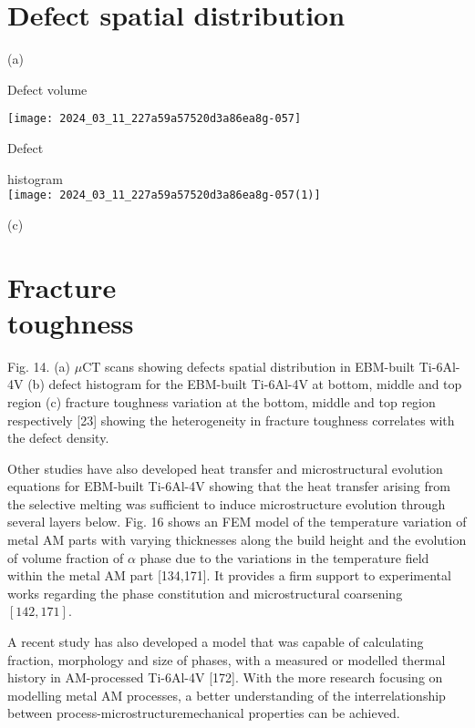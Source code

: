 \documentclass[10pt]{article}
\begin{document}
\section*{Defect spatial distribution}
(a)

Defect volume

\begin{center}
\texttt{[image: 2024\_03\_11\_227a59a57520d3a86ea8g-057]}
\end{center}

Defect

histogram\\
\texttt{[image: 2024\_03\_11\_227a59a57520d3a86ea8g-057(1)]}

(c)

\section*{Fracture \\
 toughness}
Fig. 14. (a) $\mu \mathrm{CT}$ scans showing defects spatial distribution in EBM-built Ti-6Al-4V (b) defect histogram for the EBM-built Ti-6Al-4V at bottom, middle and top region (c) fracture toughness variation at the bottom, middle and top region respectively [23] showing the heterogeneity in fracture toughness correlates with the defect density.

Other studies have also developed heat transfer and microstructural evolution equations for EBM-built Ti-6Al-4V showing that the heat transfer arising from the selective melting was sufficient to induce microstructure evolution through several layers below. Fig. 16 shows an FEM model of the temperature variation of metal AM parts with varying thicknesses along the build height and the evolution of volume fraction of $\alpha$ phase due to the variations in the temperature field within the metal AM part [134,171]. It provides a firm support to experimental works regarding the phase constitution and microstructural coarsening $[142,171]$.

A recent study has also developed a model that was capable of calculating fraction, morphology and size of phases, with a measured or modelled thermal history in AM-processed Ti-6Al-4V [172]. With the more research focusing on modelling metal AM processes, a better understanding of the interrelationship between process-microstructuremechanical properties can be achieved.
\end{document}
